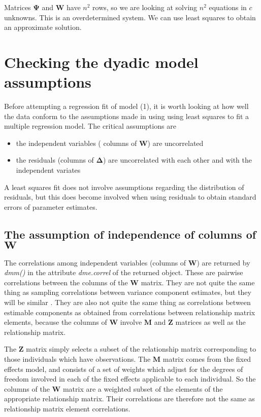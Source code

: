 \documentclass[titlepage,a4paper,12pt]{article}  %
\begin{document}
Matrices $\bm{\Psi}$ and $\bm{W}$ have $n^{2}$ rows, so we are looking at solving $n^{2}$ equations in $c$ unknowns. This is an overdetermined system. We can use least squares to obtain an approximate solution. 

\section{Checking the dyadic model assumptions}
Before attempting a regression fit of model (1), it is worth looking at how well the data conform to the assumptions made in using using least squares to fit a multiple regression model. The critical assumptions are

\begin{itemize}
\item the independent variables ( columns of $\bm{W}$) are uncorrelated
\item the residuals (columns of $\bm{\Delta}$) are uncorrelated with each other and with the independent variates
\end{itemize}

A least squares fit does not involve assumptions regarding the distribution of residuals, but this does become involved when using residuals to obtain standard errors of parameter estimates.

\subsection{The assumption of independence of columns of $\bm{W}$}

The correlations among independent variables (columns of $\bm{W}$) are returned by {\em dmm()} in the attribute {\em dme.correl} of the returned object.  These are pairwise correlations between the columns of the $\bm{W}$ matrix. They are not quite the same thing as sampling correlations between variance component estimates, but they will be similar . They are also not quite the same thing as correlations between estimable components as obtained from correlations between relationship matrix elements, because the columns of ${\bm W}$ involve ${\bm M}$ and ${\bm Z}$ matrices as well as the relationship matrix.  

The $\bm{Z}$ matrix simply selects a subset of the relationship matrix corresponding to those individuals which have observations. The $\bm{M}$ matrix comes from the fixed effects model, and consists of a set of weights which adjust for the degrees of freedom involved in each of the fixed effects applicable to each individual. So the columns of the $\bm{W}$ matrix are a weighted subset of the elements of the appropriate relationship matrix. Their correlations are therefore not the same as relationship matrix element correlations.
\end{document}
